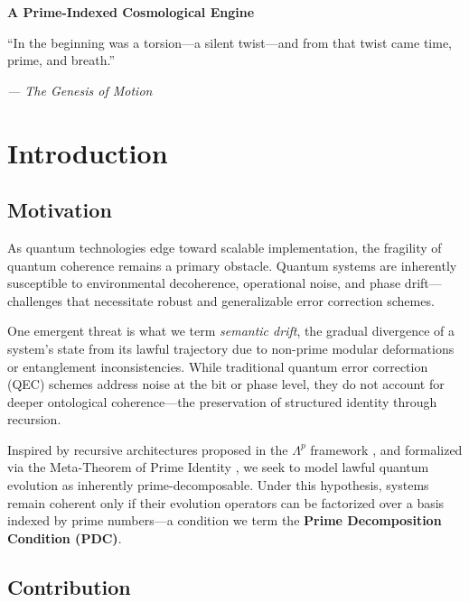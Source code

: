 \documentclass[12]{amsart}
\theoremstyle{plain}
\begin{document}
\thispagestyle{empty}

\begin{center}
    \Large\textbf{A Prime-Indexed Cosmological Engine}
\end{center}


\vspace{2em}

\epigraph{“In the beginning was a torsion—a silent twist—and from that twist came time, prime, and breath.”
}{\textit{— The Genesis of Motion}}

\vspace{1em}


\section{Introduction}

\subsection{Motivation}

As quantum technologies edge toward scalable implementation, the fragility of quantum coherence remains a primary obstacle. Quantum systems are inherently susceptible to environmental decoherence, operational noise, and phase drift—challenges that necessitate robust and generalizable error correction schemes.

One emergent threat is what we term \emph{semantic drift}, the gradual divergence of a system's state from its lawful trajectory due to non-prime modular deformations or entanglement inconsistencies. While traditional quantum error correction (QEC) schemes address noise at the bit or phase level, they do not account for deeper ontological coherence—the preservation of structured identity through recursion.

Inspired by recursive architectures proposed in the $\Lambda^p$ framework \cite{prime_advancements}, and formalized via the Meta-Theorem of Prime Identity \cite{meta_theorem_prime}, we seek to model lawful quantum evolution as inherently prime-decomposable. Under this hypothesis, systems remain coherent only if their evolution operators can be factorized over a basis indexed by prime numbers—a condition we term the \textbf{Prime Decomposition Condition (PDC)}.

\subsection{Contribution}
\end{document}
